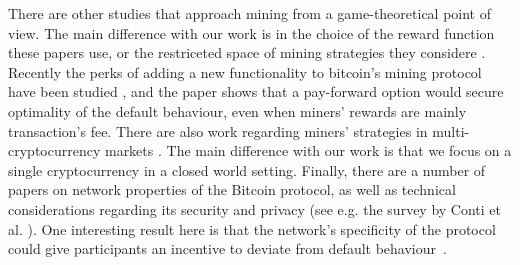 There are other studies that approach mining from a game-theoretical point of view. The main difference with our work is in the choice of the reward function \cite{economics_of_mining2013,selfishmining2014,optimalselfishmining2017,biais2018blockchain,instabilitywithoutreward:2016} these papers use, or the restriceted space of mining strategies they considere  \cite{economics_of_mining2013,selfishmining2014,optimalselfishmining2017}. Recently the perks of adding a new functionality to bitcoin's mining protocol have been studied \cite{koutsoupias2018blockchain}, and the paper shows that a pay-forward option would secure optimality of the default behaviour, even when miners' rewards are mainly transaction's fee. 
There are also work regarding miners' strategies in multi-cryptocurrency markets \cite{dhamal2018stochastic,spiegelman2018game}. The main difference with our work is that we focus on a single cryptocurrency in a closed world setting. Finally, there are a number of papers on network properties of the Bitcoin protocol, as well as technical considerations regarding its security and privacy (see e.g. the survey by Conti et al. \cite{conti2018survey}). One interesting result here is that the network's specificity of the protocol could give participants an incentive to deviate from default behaviour~\cite{bitcoin_attacks_2013,ddos_attacks2014,empirical_dos_attacks2014}.   

